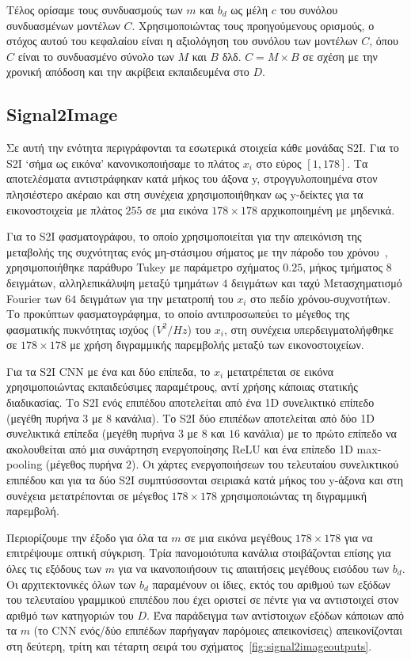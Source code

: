 Τέλος ορίσαμε τους συνδυασμούς των $m$ και $b_d$ ως μέλη $c$ του συνόλου συνδυασμένων μοντέλων $C$.
Χρησιμοποιώντας τους προηγούμενους ορισμούς, ο στόχος αυτού του κεφαλαίου είναι η αξιολόγηση του συνόλου των μοντέλων $C$, όπου $C$ είναι το συνδυασμένο σύνολο των $M$ και $B$ δλδ. $C=M\times B$ σε σχέση με την χρονική απόδοση και την ακρίβεια εκπαιδευμένα στο $D$.

\subsection{Signal2Image}
Σε αυτή την ενότητα περιγράφονται τα εσωτερικά στοιχεία κάθε μονάδας S2I.
Για το S2I `σήμα ως εικόνα' κανονικοποιήσαμε το πλάτος $x_i$ στο εύρος $[1, 178]$.
Τα αποτελέσματα αντιστράφηκαν κατά μήκος του άξονα y, στρογγυλοποιημένα στον πλησιέστερο ακέραιο και στη συνέχεια χρησιμοποιήθηκαν ως y-δείκτες για τα εικονοστοιχεία με πλάτος $255$ σε μια εικόνα $178\times 178$ αρχικοποιημένη με μηδενικά.

Για το S2I φασματογράφου, το οποίο χρησιμοποιείται για την απεικόνιση της μεταβολής της συχνότητας ενός μη-στάσιμου σήματος με την πάροδο του χρόνου~\cite{oppenheim1999discrete}, χρησιμοποιήθηκε παράθυρο Tukey με παράμετρο σχήματος $0.25$, μήκος τμήματος $8$ δειγμάτων, αλληλεπικάλυψη μεταξύ τμημάτων $4$ δειγμάτων και ταχύ Μετασχηματισμό Fourier των $64$ δειγμάτων για την μετατροπή του $x_i$ στο πεδίο χρόνου-συχνοτήτων.
Το προκύπτων φασματογράφημα, το οποίο αντιπροσωπεύει το μέγεθος της φασματικής πυκνότητας ισχύος ($V^2/Hz$) του $x_i$, στη συνέχεια υπερδειγματολήφθηκε σε $178\times 178$ με χρήση διγραμμικής παρεμβολής μεταξύ των εικονοστοιχείων.

Για τα S2I CNN με ένα και δύο επίπεδα, το $x_i$ μετατρέπεται σε εικόνα χρησιμοποιώντας εκπαιδεύσιμες παραμέτρους, αντί χρήσης κάποιας στατικής διαδικασίας.
Το S2I ενός επιπέδου αποτελείται από ένα 1D συνελικτικό επίπεδο (μεγέθη πυρήνα $3$ με $8$ κανάλια).
Το S2I δύο επιπέδων αποτελείται από δύο 1D συνελικτικά επίπεδα (μεγέθη πυρήνα $3$ με $8$ και $16$ κανάλια) με το πρώτο επίπεδο να ακολουθείται από μια συνάρτηση ενεργοποίησης ReLU και ένα επίπεδο 1D max-pooling (μέγεθος πυρήνα $2$).
Οι χάρτες ενεργοποιήσεων του τελευταίου συνελικτικού επιπέδου και για τα δύο S2I συμπτύσσονται σειριακά κατά μήκος του y-άξονα και στη συνέχεια μετατρέπονται σε μέγεθος $178\times 178$ χρησιμοποιώντας τη διγραμμική παρεμβολή.

Περιορίζουμε την έξοδο για όλα τα $m$ σε μια εικόνα μεγέθους $178\times 178$ για να επιτρέψουμε οπτική σύγκριση.
Τρία πανομοιότυπα κανάλια στοιβάζονται επίσης για όλες τις εξόδους των $m$ για να ικανοποιήσουν τις απαιτήσεις μεγέθους εισόδου των $b_d$.
Οι αρχιτεκτονικές όλων των $b_d$ παραμένουν οι ίδιες, εκτός του αριθμού των εξόδων του τελευταίου γραμμικού επιπέδου που έχει οριστεί σε πέντε για να αντιστοιχεί στον αριθμό των κατηγοριών του $D$.
Ένα παράδειγμα των αντίστοιχων εξόδων κάποιων από τα $m$ (το CNN ενός/δύο επιπέδων παρήγαγαν παρόμοιες απεικονίσεις) απεικονίζονται στη δεύτερη, τρίτη και τέταρτη σειρά του σχήματος~\ref{fig:signal2imageoutputs}.

